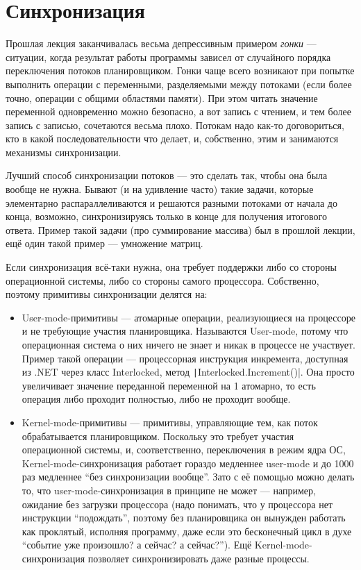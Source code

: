 \documentclass{../../text-style}
\begin{document}
\maketitle
\thispagestyle{empty}

\section{Синхронизация}

Прошлая лекция заканчивалась весьма депрессивным примером \textit{гонки} --- ситуации, когда результат работы программы зависел от случайного порядка переключения потоков планировщиком. Гонки чаще всего возникают при попытке выполнить операции с переменными, разделяемыми между потоками (если более точно, операции с общими областями памяти). При этом читать значение переменной одновременно можно безопасно, а вот запись с чтением, и тем более запись с записью, сочетаются весьма плохо. Потокам надо как-то договориться, кто в какой последовательности что делает, и, собственно, этим и занимаются механизмы синхронизации.

Лучший способ синхронизации потоков --- это сделать так, чтобы она была вообще не нужна. Бывают (и на удивление часто) такие задачи, которые элементарно распараллеливаются и решаются разными потоками от начала до конца, возможно, синхронизируясь только в конце для получения итогового ответа. Пример такой задачи (про суммирование массива) был в прошлой лекции, ещё один такой пример --- умножение матриц.

Если синхронизация всё-таки нужна, она требует поддержки либо со стороны операционной системы, либо со стороны самого процессора. Собственно, поэтому примитивы синхронизации делятся на:

\begin{itemize}
    \item User-mode-примитивы --- атомарные операции, реализующиеся на процессоре и не требующие участия планировщика. Называются User-mode, потому что операционная система о них ничего не знает и никак в процессе не участвует. Пример такой операции --- процессорная инструкция инкремента, доступная из .NET через класс Interlocked, метод \texttt|Interlocked.Increment()|. Она просто увеличивает значение переданной переменной на 1 атомарно, то есть операция либо проходит полностью, либо не проходит вообще.
    \item Kernel-mode-примитивы --- примитивы, управляющие тем, как поток обрабатывается планировщиком. Поскольку это требует участия операционной системы, и, соответственно, переключения в режим ядра ОС, Kernel-mode-синхронизация работает гораздо медленнее user-mode и до 1000 раз медленнее ``без синхронизации вообще''. Зато с её помощью можно делать то, что user-mode-синхронизация в принципе не может --- например, ожидание без загрузки процессора (надо понимать, что у процессора нет инструкции ``подождать'', поэтому без планировщика он вынужден работать как проклятый, исполняя программу, даже если это бесконечный цикл в духе ``событие уже произошло? а сейчас? а сейчас?''). Ещё Kernel-mode-синхронизация позволяет синхронизировать даже разные процессы.
\end{itemize}
\end{document}
